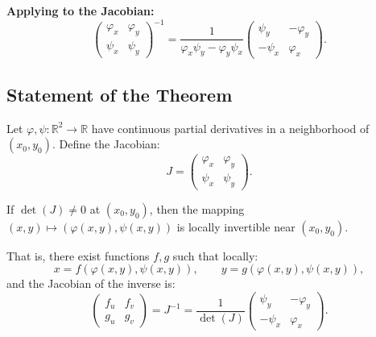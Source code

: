 \documentclass[11pt]{report}
\newcommand{\R}{\mathbb{R}}
\begin{document}
\textbf{Applying to the Jacobian:}
\[
\begin{pmatrix} \varphi_x & \varphi_y \\ \psi_x & \psi_y \end{pmatrix}^{-1} = \frac{1}{\varphi_x \psi_y - \varphi_y \psi_x} \begin{pmatrix} \psi_y & -\varphi_y \\ -\psi_x & \varphi_x \end{pmatrix}.
\]

\subsection{Statement of the Theorem}

\begin{theorem}
Let $\varphi, \psi : \R^2 \to \R$ have continuous partial derivatives in a neighborhood of $(x_0, y_0)$. Define the Jacobian:
\[
J = \begin{pmatrix} \varphi_x & \varphi_y \\ \psi_x & \psi_y \end{pmatrix}.
\]

If $\det(J) \neq 0$ at $(x_0, y_0)$, then the mapping $(x, y) \mapsto (\varphi(x,y), \psi(x,y))$ is locally invertible near $(x_0, y_0)$.

That is, there exist functions $f, g$ such that locally:
\[
x = f(\varphi(x,y), \psi(x,y)), \qquad y = g(\varphi(x,y), \psi(x,y)),
\]
and the Jacobian of the inverse is:
\[
\begin{pmatrix} f_u & f_v \\ g_u & g_v \end{pmatrix} = J^{-1} = \frac{1}{\det(J)} \begin{pmatrix} \psi_y & -\varphi_y \\ -\psi_x & \varphi_x \end{pmatrix}.
\]
\end{theorem}
\end{document}
